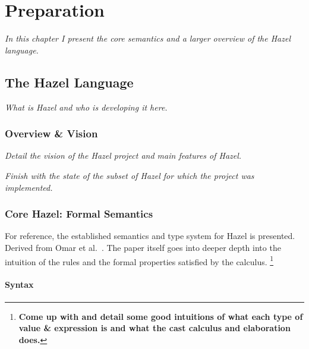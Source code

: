 \chapter{Preparation}
\textit{In this chapter I present the core semantics and a larger overview of the Hazel language.}
\section{The Hazel Language}
\textit{What is Hazel and who is developing it here.}

\subsection{Overview \& Vision}
\textit{Detail the vision of the Hazel project and main features of Hazel.}\par 
\textit{Finish with the state of the subset of Hazel for which the project was implemented.}

\subsection{\textbf{Core Hazel}: Formal Semantics}
For reference, the established semantics and type system for Hazel is presented. Derived from Omar et al.\ \cite{HazelLivePaper}. The paper itself goes into deeper depth into the intuition of the rules and the formal properties satisfied by the calculus.
\footnote{
\textbf{Come up with and detail some good intuitions of what each type of value \& expression is and what the cast calculus and elaboration does.}}
\subsubsection{Syntax}

